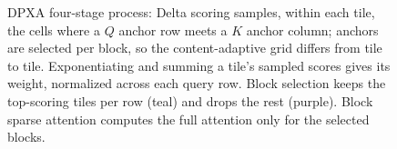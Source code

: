 \begin{figure}[ht]
{
}
\caption{DPXA four-stage process: Delta scoring samples, within each tile, the cells where a $Q$ anchor row meets a $K$ anchor column; anchors are selected per block, so the content-adaptive grid differs from tile to tile. Exponentiating and summing a tile's sampled scores gives its weight, normalized across each query row. Block selection keeps the top-scoring tiles per row (teal) and drops the rest (purple). Block sparse attention computes the full attention only for the selected blocks.}
\label{fig:dpxa_3part}
\end{figure}
